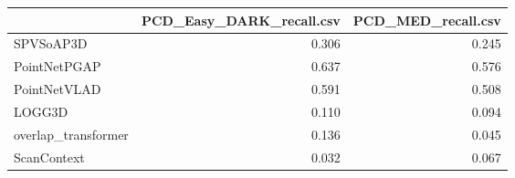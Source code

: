 \begin{tabular}{lrr}
\hline
&PCD\_Easy\_DARK\_recall.csv&PCD\_MED\_recall.csv\\
\hline
SPVSoAP3D&0.306&0.245\\
PointNetPGAP&0.637&0.576\\
PointNetVLAD&0.591&0.508\\
LOGG3D&0.110&0.094\\
overlap\_transformer&0.136&0.045\\
ScanContext&0.032&0.067\\
\hline
\end{tabular}